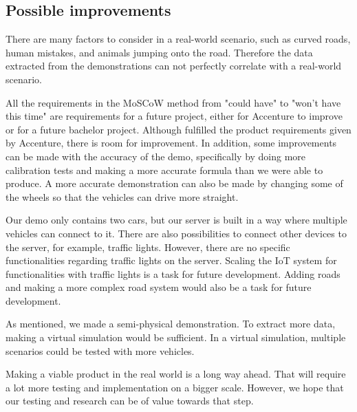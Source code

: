 \subsection{Possible improvements}

There are many factors to consider in a real-world scenario, such as curved roads, human mistakes, and animals jumping onto the road. Therefore the data extracted from the demonstrations can not perfectly correlate with a real-world scenario. 

All the requirements in the MoSCoW method from "could have" to "won't have this time" are requirements for a future project, either for Accenture to improve or for a future bachelor project. Although fulfilled the product requirements given by Accenture, there is room for improvement. In addition, some improvements can be made with the accuracy of the demo, specifically by doing more calibration tests and making a more accurate formula than we were able to produce. A more accurate demonstration can also be made by changing some of the wheels so that the vehicles can drive more straight.

Our demo only contains two cars, but our server is built in a way where multiple vehicles can connect to it. There are also possibilities to connect other devices to the server, for example, traffic lights. However, there are no specific functionalities regarding traffic lights on the server. Scaling the IoT system for functionalities with traffic lights is a task for future development. Adding roads and making a more complex road system would also be a task for future development. 

As mentioned, we made a semi-physical demonstration. To extract more data, making a virtual simulation would be sufficient. In a virtual simulation, multiple scenarios could be tested with more vehicles.  

Making a viable product in the real world is a long way ahead. That will require a lot more testing and implementation on a bigger scale. However, we hope that our testing and research can be of value towards that step.